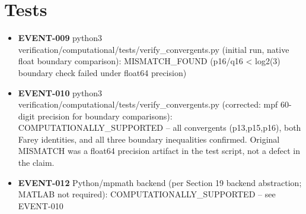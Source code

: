 \documentclass[11pt]{article}
\begin{document}
\section{Tests}
\begin{itemize}
\item \textbf{EVENT-009} python3 verification/computational/tests/verify\_convergents.py (initial run, native float boundary comparison): MISMATCH\_FOUND (p16/q16 < log2(3) boundary check failed under float64 precision)
\item \textbf{EVENT-010} python3 verification/computational/tests/verify\_convergents.py (corrected: mpf 60-digit precision for boundary comparisons): COMPUTATIONALLY\_SUPPORTED -- all convergents (p13,p15,p16), both Farey identities, and all three boundary inequalities confirmed. Original MISMATCH was a float64 precision artifact in the test script, not a defect in the claim.
\item \textbf{EVENT-012} Python/mpmath backend (per Section 19 backend abstraction; MATLAB not required): COMPUTATIONALLY\_SUPPORTED -- see EVENT-010
\end{itemize}
\end{document}

